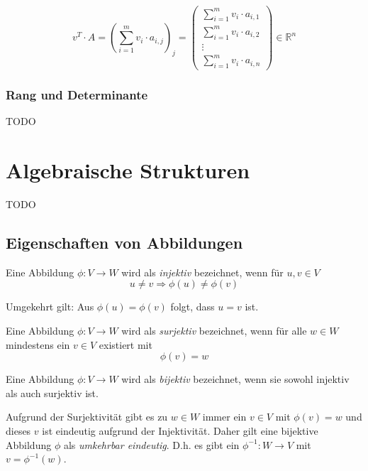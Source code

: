 \[
v^T \cdot A = (\sum_{i=1}^{m}v_i\cdot a_{i,j})_{j} = \begin{pmatrix}
\sum_{i=1}^{m}v_i\cdot a_{i,1} \\
\sum_{i=1}^{m}v_i\cdot a_{i,2} \\
\vdots \\
\sum_{i=1}^{m}v_i\cdot a_{i,n}
\end{pmatrix} \in \mathbb{R}^n
\]

\subsubsection{Rang und Determinante}

TODO

\section{Algebraische Strukturen}

TODO

\subsection{Eigenschaften von Abbildungen}


\begin{definition}
Eine Abbildung $\phi : V \longrightarrow W$ wird als \textsl{injektiv} bezeichnet, wenn für $u,v \in V$ 
\[ u\ne v \Rightarrow \phi(u) \ne \phi(v) \]
\end{definition}
Umgekehrt gilt: Aus $\phi(u)=\phi(v)$ folgt, dass $u=v$ ist. 

\begin{definition}
Eine Abbildung $\phi : V \longrightarrow W$ wird als \textsl{surjektiv} bezeichnet, wenn für alle $w\in W$ mindestens ein $v\in V$ existiert mit 
\[\phi(v) = w\]
\end{definition}

\begin{definition}
Eine Abbildung $\phi : V \longrightarrow W$ wird als \textsl{bijektiv} bezeichnet, wenn sie sowohl injektiv als auch surjektiv ist. 
\end{definition}

Aufgrund der Surjektivität gibt es zu $w\in W$ immer ein $v\in V$  mit $\phi(v)=w$ und dieses $v$ ist eindeutig aufgrund der Injektivität. Daher gilt eine bijektive Abbildung $\phi$ als \textsl{umkehrbar eindeutig}. D.h. es gibt ein $\phi^{-1} : W \longrightarrow V$ mit $v = \phi^{-1}(w)$.

